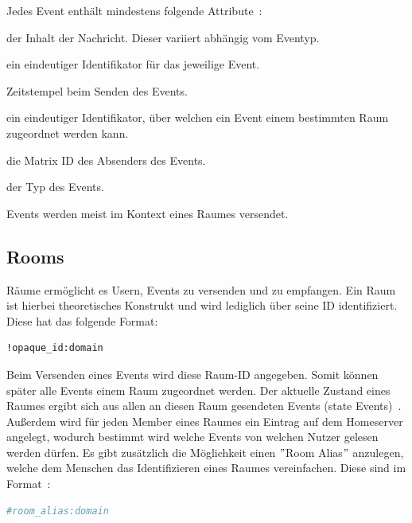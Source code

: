     Jedes Event enthält mindestens folgende Attribute~\cite{eventformat}:
    \begin{description}[leftmargin=!,labelwidth=3.5cm]
        \item [content] der Inhalt der Nachricht. Dieser variiert abhängig vom Eventyp.
        \item [event\_id] ein eindeutiger Identifikator für das jeweilige Event.
        \item [origin\_server\_ts] Zeitstempel beim Senden des Events.
        \item [room\_id] ein eindeutiger Identifikator, über welchen ein Event einem bestimmten Raum zugeordnet werden kann.
        \item [sender] die Matrix ID des Absenders des Events.
        \item [type] der Typ des Events.
    \end{description}

    Events werden meist im Kontext eines Raumes versendet.

    \newpage
    \subsection{Rooms}\label{subsec:rooms}
    Räume ermöglicht es Usern, Events zu versenden und zu empfangen.
    Ein Raum ist hierbei theoretisches Konstrukt und wird lediglich über seine ID identifiziert.
    Diese hat das folgende Format:
    \begin{lstlisting}[language=bash,label={lst:roomid}]
        !opaque_id:domain
    \end{lstlisting}
    Beim Versenden eines Events wird diese Raum-ID angegeben.
    Somit können später alle Events einem Raum zugeordnet werden.
    Der aktuelle Zustand eines Raumes ergibt sich aus allen an diesen Raum gesendeten Events (state Events)~\cite{rooms}.
    Außerdem wird für jeden Member eines Raumes ein Eintrag auf dem Homeserver angelegt, wodurch bestimmt wird welche Events von welchen Nutzer gelesen werden dürfen.
    Es gibt zusätzlich die Möglichkeit einen \("\)Room Alias\("\) anzulegen, welche dem Menschen das Identifizieren eines Raumes vereinfachen.
    Diese sind im Format~\cite{rooms}:
    \begin{lstlisting}[language=bash,label={lst:roomalias}]
        #room_alias:domain
    \end{lstlisting}


